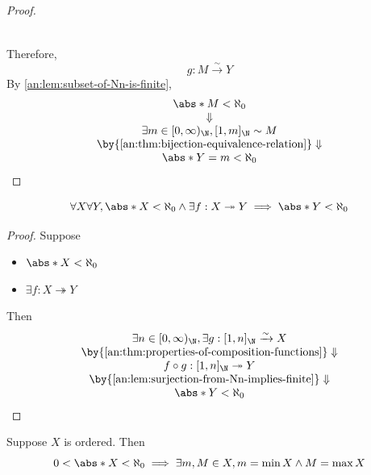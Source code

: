 \begin{proof}
\begin{itemize}
\[\begin{array}{c}
            \end{array}
          \]
  \end{itemize}
  Therefore,
  \[
    g: M \xrightarrow{\sim} Y
  \]
  By \cref{an:lem:subset-of-Nn-is-finite},
  \[
    \begin{array}{c}
      \abs*{M} < \aleph_{0}                                        \\
      \Downarrow                                                   \\
      \exists m \in [0, \infty)_{\N}, [1, m]_{\N} \sim M           \\
      \by{\Cref{an:thm:bijection-equivalence-relation}} \Downarrow \\
      \abs*{Y} = m < \aleph_{0}
    \end{array}
  \]
\end{proof}

\bigskip

\begin{theorem} \label{an:thm:surjection-from-finite-set-implies-finite}
  \[
    \forall X \forall Y, \abs*{X} < \aleph_{0} \land \exists f: X \twoheadrightarrow Y
    \implies \abs*{Y} < \aleph_{0}
  \]
\end{theorem}

\begin{proof}
  Suppose
  \begin{itemize}
    \item $\abs*{X} < \aleph_{0}$
    \item $\exists f: X \twoheadrightarrow Y$
  \end{itemize}
  Then
  \[
    \begin{array}{c}
      \exists n \in [0, \infty)_{\N}, \exists g: [1, n]_{\N} \xrightarrow{\sim} X \\
      \by{\Cref{an:thm:properties-of-composition-functions}} \Downarrow           \\
      f \circ g: [1, n]_{\N} \twoheadrightarrow Y                                 \\
      \by{\Cref{an:lem:surjection-from-Nn-implies-finite}} \Downarrow             \\
      \abs*{Y} < \aleph_{0}
    \end{array}
  \]
\end{proof}

\bigskip

\begin{theorem} \label{an:thm:finite-ordered-set-has-extremum}
  Suppose $X$ is ordered. Then
  \[
    0 < \abs*{X} < \aleph_{0} \implies \exists m, M \in X, m = \min X \land M = \max X
  \]
\end{theorem}


